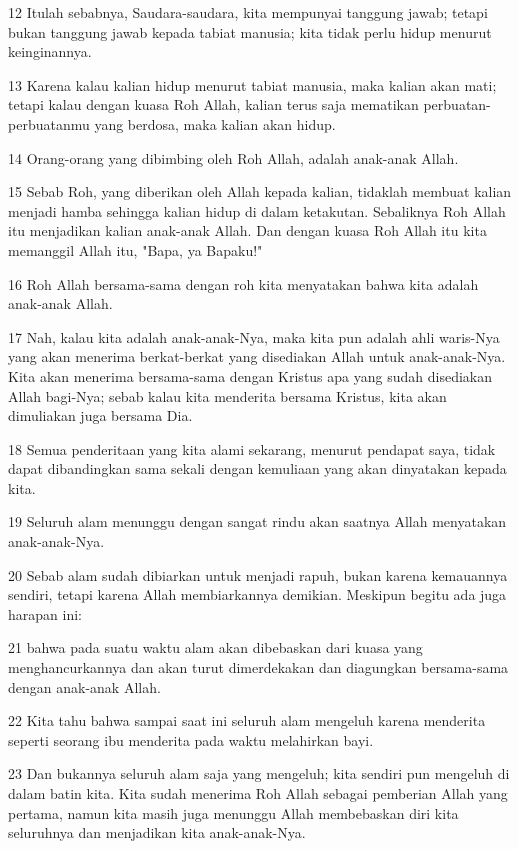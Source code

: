 \par 12 Itulah sebabnya, Saudara-saudara, kita mempunyai tanggung jawab; tetapi bukan tanggung jawab kepada tabiat manusia; kita tidak perlu hidup menurut keinginannya.
\par 13 Karena kalau kalian hidup menurut tabiat manusia, maka kalian akan mati; tetapi kalau dengan kuasa Roh Allah, kalian terus saja mematikan perbuatan-perbuatanmu yang berdosa, maka kalian akan hidup.
\par 14 Orang-orang yang dibimbing oleh Roh Allah, adalah anak-anak Allah.
\par 15 Sebab Roh, yang diberikan oleh Allah kepada kalian, tidaklah membuat kalian menjadi hamba sehingga kalian hidup di dalam ketakutan. Sebaliknya Roh Allah itu menjadikan kalian anak-anak Allah. Dan dengan kuasa Roh Allah itu kita memanggil Allah itu, "Bapa, ya Bapaku!"
\par 16 Roh Allah bersama-sama dengan roh kita menyatakan bahwa kita adalah anak-anak Allah.
\par 17 Nah, kalau kita adalah anak-anak-Nya, maka kita pun adalah ahli waris-Nya yang akan menerima berkat-berkat yang disediakan Allah untuk anak-anak-Nya. Kita akan menerima bersama-sama dengan Kristus apa yang sudah disediakan Allah bagi-Nya; sebab kalau kita menderita bersama Kristus, kita akan dimuliakan juga bersama Dia.
\par 18 Semua penderitaan yang kita alami sekarang, menurut pendapat saya, tidak dapat dibandingkan sama sekali dengan kemuliaan yang akan dinyatakan kepada kita.
\par 19 Seluruh alam menunggu dengan sangat rindu akan saatnya Allah menyatakan anak-anak-Nya.
\par 20 Sebab alam sudah dibiarkan untuk menjadi rapuh, bukan karena kemauannya sendiri, tetapi karena Allah membiarkannya demikian. Meskipun begitu ada juga harapan ini:
\par 21 bahwa pada suatu waktu alam akan dibebaskan dari kuasa yang menghancurkannya dan akan turut dimerdekakan dan diagungkan bersama-sama dengan anak-anak Allah.
\par 22 Kita tahu bahwa sampai saat ini seluruh alam mengeluh karena menderita seperti seorang ibu menderita pada waktu melahirkan bayi.
\par 23 Dan bukannya seluruh alam saja yang mengeluh; kita sendiri pun mengeluh di dalam batin kita. Kita sudah menerima Roh Allah sebagai pemberian Allah yang pertama, namun kita masih juga menunggu Allah membebaskan diri kita seluruhnya dan menjadikan kita anak-anak-Nya.
